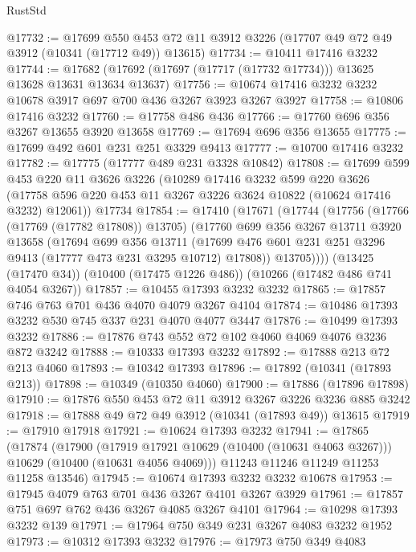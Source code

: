 \begin{lexlean}{RustStd}
\begin{coremodule}
{\begin{coremodule}
{{{{{{{{{{{{{{{{{{{{{{{{{@17732 := @17699
    @550
    @453
    @72
    @11
    @3912
    @3226
    (@17707 @49 @72 @49 @3912 (@10341 (@17712 @49)) @13615)
@17734 := @10411 @17416 @3232
@17744 := @17682 (@17692 (@17697 (@17717 (@17732 @17734))) @13625 @13628 @13631 @13634 @13637)
@17756 := @10674 @17416 @3232 @3232 @10678 @3917 @697 @700 @436 @3267 @3923 @3267 @3927
@17758 := @10806 @17416 @3232
@17760 := @17758 @486 @436
@17766 := @17760 @696 @356 @3267 @13655 @3920 @13658
@17769 := @17694 @696 @356 @13655
@17775 := @17699 @492 @601 @231 @251 @3329 @9413
@17777 := @10700 @17416 @3232
@17782 := @17775 (@17777 @489 @231 @3328 @10842)
@17808 := @17699
    @599
    @453
    @220
    @11
    @3626
    @3226
    (@10289
      @17416
      @3232
      @599
      @220
      @3626
      (@17758 @596 @220 @453 @11 @3267 @3226 @3624 @10822 (@10624 @17416 @3232) @12061))
    @17734
@17854 := @17410
    (@17671
      (@17744
        (@17756
          (@17766 (@17769 (@17782 @17808)) @13705)
          (@17760
            @699
            @356
            @3267
            @13711
            @3920
            @13658
            (@17694
              @699
              @356
              @13711
              (@17699 @476 @601 @231 @251 @3296 @9413 (@17777 @473 @231 @3295 @10712) @17808))
            @13705))))
    (@13425 (@17470 @34))
    (@10400 (@17475 @1226 @486))
    (@10266 (@17482 @486 @741 @4054 @3267))
@17857 := @10455 @17393 @3232 @3232
@17865 := @17857 @746 @763 @701 @436 @4070 @4079 @3267 @4104
@17874 := @10486 @17393 @3232 @530 @745 @337 @231 @4070 @4077 @3447
@17876 := @10499 @17393 @3232
@17886 := @17876 @743 @552 @72 @102 @4060 @4069 @4076 @3236 @872 @3242
@17888 := @10333 @17393 @3232
@17892 := @17888 @213 @72 @213 @4060
@17893 := @10342 @17393
@17896 := @17892 (@10341 (@17893 @213))
@17898 := @10349 (@10350 @4060)
@17900 := @17886 (@17896 @17898)
@17910 := @17876 @550 @453 @72 @11 @3912 @3267 @3226 @3236 @885 @3242
@17918 := @17888 @49 @72 @49 @3912 (@10341 (@17893 @49)) @13615
@17919 := @17910 @17918
@17921 := @10624 @17393 @3232
@17941 := @17865
    (@17874
      (@17900
        (@17919 @17921 @10629 (@10400 (@10631 @4063 @3267)))
        @10629
        (@10400 (@10631 @4056 @4069)))
      @11243
      @11246
      @11249
      @11253
      @11258
      @13546)
@17945 := @10674 @17393 @3232 @3232 @10678
@17953 := @17945 @4079 @763 @701 @436 @3267 @4101 @3267 @3929
@17961 := @17857 @751 @697 @762 @436 @3267 @4085 @3267 @4101
@17964 := @10298 @17393 @3232 @139
@17971 := @17964 @750 @349 @231 @3267 @4083 @3232 @1952
@17973 := @10312 @17393 @3232
@17976 := @17973 @750 @349 @4083
}}}}}}}}}}}}}}}}}}}}}}}}}
\end{coremodule}}
\end{coremodule}
\end{lexlean}
